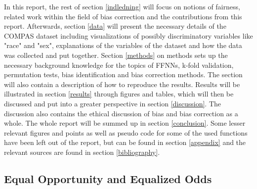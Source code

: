\documentclass[11pt, fleqn, titlepage]{article}
\begin{document}
	\noindent In this report, the rest of section \ref{indledning} will focus on notions of fairness, related work within the field of bias correction and the contributions from this report. Afterwards, section \ref{data} will present the necessary details of the COMPAS dataset including visualizations of possibly discriminatory variables like "race" and "sex", explanations of the variables of the dataset and how the data was collected and put together. Section \ref{methods} on methods sets up the necessary background knowledge for the topics of FFNNs, k-fold validation, permutation tests, bias identification and bias correction methods. The section will also contain a description of how to reproduce the results. Results will be illustrated in section \ref{results} through figures and tables, which will then be discussed and put into a greater perspective in section \ref{discussion}. The discussion also contains the ethical discussion of bias and bias correction as a whole. The whole report will be summed up in section \ref{conclusion}. Some lesser relevant figures and points as well as pseudo code for some of the used functions have been left out of the report, but can be found in section \ref{appendix} and the relevant sources are found in section \ref{bibliography}.
	
	\subsection{Equal Opportunity and Equalized Odds}\label{bias_def}
	
\end{document}
